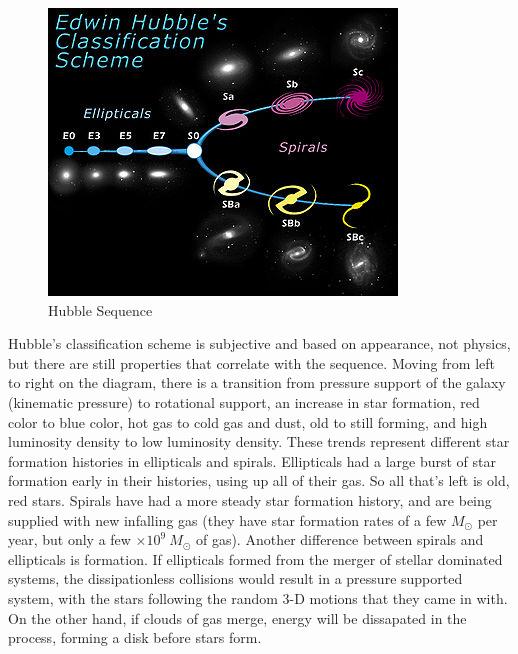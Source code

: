 \begin{figure}[!h]
\begin{center}
\includegraphics[width=\textwidth]{fork.jpg}
\end{center}
\caption{Hubble Sequence 
\label{fig:fork}}
\end{figure}

Hubble's classification scheme is subjective and based on appearance, not 
physics, but there are still properties that correlate with the sequence.  
Moving from left to right on the diagram, there is a transition from 
pressure support of the galaxy (kinematic pressure) to rotational support, 
an increase in star formation, red color to blue color, hot gas to cold gas 
and dust, old to still forming, and high luminosity density to low luminosity 
density.  These trends represent different star formation histories in 
ellipticals and spirals.  Ellipticals had a large burst of star formation 
early in their histories, using up all of their gas.  So all that's left is 
old, red stars.  Spirals have had a more steady star formation history, and 
are being supplied with new infalling gas (they have star formation rates of a 
few $M_{\odot}$ per year, but only a few $\times 10^9\ M_{\odot}$ of gas).  
Another difference between spirals and ellipticals is formation.  If 
ellipticals formed from the merger of stellar dominated systems, the 
dissipationless collisions would result in a pressure supported system, 
with the stars following the random $3$-D motions that they came in with.  
On the other hand, if clouds of gas merge, energy will be dissapated in the 
process, forming a disk before stars form.  

